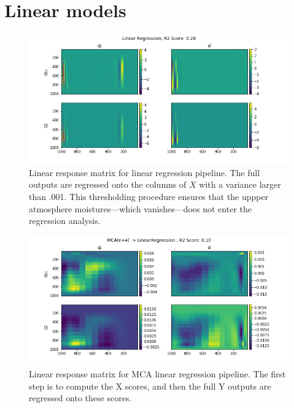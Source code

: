 \documentclass{report}
\newcommand{\1}[1]{\mathds{1}\left[#1\right]}
\begin{document}
\section{Linear models}

\begin{figure}[ht]
  \centering
  \includegraphics[width=\textwidth]{images/lrf_lm.png}
  \caption{\label{fig:lrf-lm}Linear response matrix for linear regression
    pipeline. 
    The full outputs are regressed onto the columns of $X$ with a variance
    larger than .001. 
    This thresholding procedure ensures that the uppper atmosphere
    moistures---which vanishes---does not enter the regression analysis.} 
\end{figure}

\begin{figure}[ht]
  \centering
  \includegraphics[width=\textwidth]{images/lrf_mca4.png}
  \caption{\label{fig:lrf-mca}Linear response matrix for MCA linear regression
    pipeline. 
    The first step is to compute the X scores, and then the full Y outputs are
    regressed onto these scores.}
\end{figure}
\end{document}
